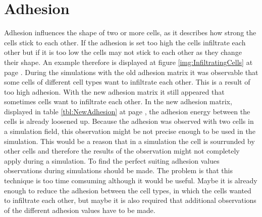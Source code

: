 \section{Adhesion}
Adhesion influences the shape of two or more cells, as it describes how strong the cells stick to each other. If the adhesion is set too high the cells infiltrate each other but if it is too low the cells may not stick to each other as they change their shape. An example therefore is displayed at figure \ref{img:InfiltratingCells} at page \pageref{img:InfiltratingCells}. During the simulations with the old adhesion matrix it was observable that some cells of different cell types want to infiltrate each other. This is a result of too high adhesion. With the new adhesion matrix it still appeared that sometimes cells want to infiltrate each other. In the new adhesion matrix, displayed in table \ref{tbl:NewAdhesion} at page \pageref{tbl:NewAdhesion}, the adhesion energy between the cells is already loosened up. Because the adhesion was observed with two cells in a simulation field, this observation might be not precise enough to be used in the simulation. This would be a reason that in a simulation the cell is sourrunded by other cells and therefore the results of the observation might not completely apply during a simulation. To find the perfect suiting adhesion values observations during simulations should be made. The problem is that this technique is too time comsuming although it would be useful. Maybe it is already enough to reduce the adhesion between the cell types, in which the cells wanted to infiltrate each other, but maybe it is also required that additional observations of the different adhesion values have to be made.

